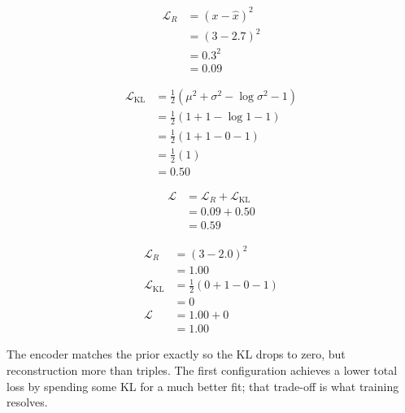 \begin{align*}
    \mathcal{L}_R &= (x - \hat{x})^2 \\
                  &= (3 - 2.7)^2 \\
                  &= 0.3^2 \\
                  &= 0.09
\end{align*}

\begin{align*}
    \mathcal{L}_{\text{KL}} &= \tfrac{1}{2}(\mu^2 + \sigma^2 - \log \sigma^2 - 1) \\
                            &= \tfrac{1}{2}(1 + 1 - \log 1 - 1) \\
                            &= \tfrac{1}{2}(1 + 1 - 0 - 1) \\
                            &= \tfrac{1}{2}(1) \\
                            &= 0.50
\end{align*}

\begin{align*}
    \mathcal{L} &= \mathcal{L}_R + \mathcal{L}_{\text{KL}} \\
                &= 0.09 + 0.50 \\
                &= 0.59
\end{align*}

\begin{align*}
    \mathcal{L}_R           &= (3 - 2.0)^2 \\
                            &= 1.00 \\[4pt]
    \mathcal{L}_{\text{KL}} &= \tfrac{1}{2}(0 + 1 - 0 - 1) \\
                            &= 0 \\[4pt]
    \mathcal{L}             &= 1.00 + 0 \\
                            &= 1.00
\end{align*}

The encoder matches the prior exactly so the KL drops to zero, but reconstruction more than triples. The first configuration achieves a lower total loss by spending some KL for a much better fit; that trade-off is what training resolves.



